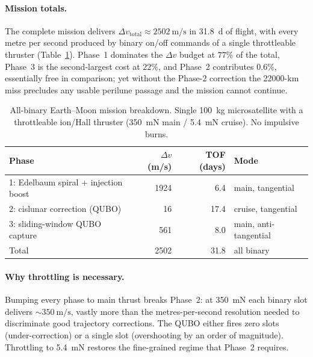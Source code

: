 \documentclass[8pt,a4paper]{article}
\theoremstyle{definition}
\theoremstyle{remark}
\begin{document}
\paragraph{Mission totals.} The complete mission delivers
$\Delta v_\mathrm{total} \approx \SI{2502}{\meter\per\second}$ in
\SI{31.8}{\day} of flight, with every metre per second produced by
binary on/off commands of a single throttleable thruster
(Table~\ref{tab:end-to-end-manual}). Phase~1 dominates the
$\Delta v$ budget at \(77\%\) of the total, Phase~3 is the
second-largest cost at \(22\%\), and Phase~2 contributes
\(0.6\%\), essentially free in comparison; yet without the
Phase-2 correction the \num{22000}-km miss precludes any usable
perilune passage and the mission cannot continue.

\begin{table}[htbp]
\centering
\caption{All-binary Earth--Moon mission breakdown. Single
\SI{100}{\kg} microsatellite with a throttleable ion/Hall thruster
(\SI{350}{\milli\newton} main / \SI{5.4}{\milli\newton} cruise).
No impulsive burns.}
\label{tab:end-to-end-manual}
\begin{tabular}{lrrl}
\toprule
Phase & $\Delta v$ (m/s) & TOF (days) & Mode \\
\midrule
1: Edelbaum spiral + injection boost
  & \num{1924} & \num{6.4} & main, tangential \\
2: cislunar correction (QUBO)
  & \num{16}   & \num{17.4} & cruise, tangential \\
3: sliding-window QUBO capture
  & \num{561}  & \num{8.0}  & main, anti-tangential \\
\midrule
Total
  & \num{2502} & \num{31.8} & all binary \\
\bottomrule
\end{tabular}
\end{table}

\paragraph{Why throttling is necessary.} Bumping every phase to
main thrust breaks Phase~2: at \SI{350}{\milli\newton} each binary
slot delivers $\sim \SI{350}{\meter\per\second}$, vastly more
than the metres-per-second resolution needed to discriminate good
trajectory corrections. The QUBO either fires zero slots
(under-correction) or a single slot (overshooting by an order of
magnitude). Throttling to \SI{5.4}{\milli\newton} restores the
fine-grained regime that Phase~2 requires.
\end{document}
